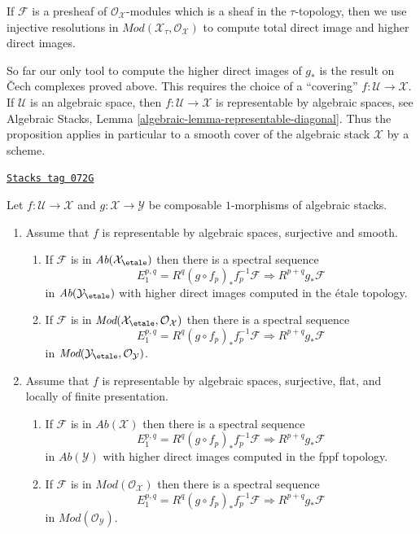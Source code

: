\medskip\noindent
If $\mathcal{F}$ is a presheaf of $\mathcal{O}_\mathcal{X}$-modules
which is a sheaf in the $\tau$-topology, then we use injective
resolutions in $\textit{Mod}(\mathcal{X}_\tau, \mathcal{O}_\mathcal{X})$
to compute total direct image and higher direct images.

\medskip\noindent
So far our only tool to compute the higher direct images of $g_*$
is the result on {\v C}ech complexes proved above. This requires the choice
of a ``covering'' $f : \mathcal{U} \to \mathcal{X}$. If $\mathcal{U}$
is an algebraic space, then $f : \mathcal{U} \to \mathcal{X}$
is representable by algebraic spaces, see
Algebraic Stacks, Lemma \ref{algebraic-lemma-representable-diagonal}.
Thus the proposition applies in particular to a smooth cover of the
algebraic stack $\mathcal{X}$ by a scheme.

\begin{proposition}
\label{stacks-sheaves-proposition-smooth-covering-compute-direct-image}
\href{https://stacks.math.columbia.edu/tag/072G}{\texttt{Stacks tag 072G}}

Let $f : \mathcal{U} \to \mathcal{X}$ and $g : \mathcal{X} \to \mathcal{Y}$
be composable $1$-morphisms of algebraic stacks.
\begin{enumerate}
\item Assume that $f$ is representable by algebraic spaces, surjective and
smooth.
\begin{enumerate}
\item If $\mathcal{F}$ is in $\textit{Ab}(\mathcal{X}_\etale)$
then there is a spectral sequence
$$
E_1^{p, q} = R^q(g \circ f_p)_*f_p^{-1}\mathcal{F}
\Rightarrow
R^{p + q}g_*\mathcal{F}
$$
in $\textit{Ab}(\mathcal{Y}_\etale)$ with higher direct images
computed in the \'etale topology.
\item If $\mathcal{F}$ is in
$\textit{Mod}(\mathcal{X}_\etale, \mathcal{O}_\mathcal{X})$ then
there is a spectral sequence
$$
E_1^{p, q} = R^q(g \circ f_p)_*f_p^{-1}\mathcal{F}
\Rightarrow
R^{p + q}g_*\mathcal{F}
$$
in $\textit{Mod}(\mathcal{Y}_\etale, \mathcal{O}_\mathcal{Y})$.
\end{enumerate}
\item Assume that $f$ is representable by algebraic spaces, surjective,
flat, and locally of finite presentation.
\begin{enumerate}
\item If $\mathcal{F}$ is in $\textit{Ab}(\mathcal{X})$ then there is
a spectral sequence
$$
E_1^{p, q} = R^q(g \circ f_p)_*f_p^{-1}\mathcal{F}
\Rightarrow
R^{p + q}g_*\mathcal{F}
$$
in $\textit{Ab}(\mathcal{Y})$ with higher direct images
computed in the fppf topology.
\item If $\mathcal{F}$ is in $\textit{Mod}(\mathcal{O}_\mathcal{X})$ then
there is a spectral sequence
$$
E_1^{p, q} = R^q(g \circ f_p)_*f_p^{-1}\mathcal{F}
\Rightarrow
R^{p + q}g_*\mathcal{F}
$$
in $\textit{Mod}(\mathcal{O}_\mathcal{Y})$.
\end{enumerate}
\end{enumerate}
\end{proposition}

